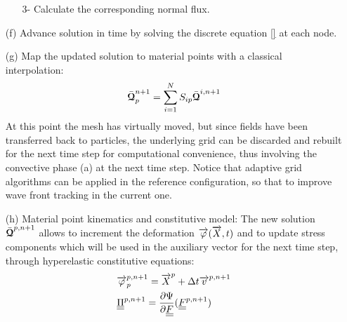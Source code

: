 \begin{itemize}
\begin{itemize}
  \item[3-] Calculate the corresponding normal flux.
  \end{itemize} 
\item[(f)] Advance solution in time by solving the discrete equation \eqref{} at each node.
\item[(g)] Map the updated solution to material points with a classical interpolation:
  \begin{equation}
    \bar{{\boldsymbol{\mathcal{Q}}}}^{n+1}_p = \sum_{i=1}^{N} S_{ip}\bar{{\boldsymbol{\mathcal{Q}}}}^{i,n+1}
  \end{equation}
  At this point the mesh has virtually moved, but since fields have been transferred back to particles, the underlying grid can be discarded and rebuilt for the next time step for computational convenience, thus involving the convective phase (a) at the next time step. Notice that adaptive grid algorithms can be applied in the reference configuration, so that to improve wave front tracking in the current one.
\item[(h)] Material point kinematics and constitutive model: The new solution $\bar{{\boldsymbol{\mathcal{Q}}}}^{p,n+1}$ allows to increment the deformation ${\overrightarrow{\varphi}}({\overrightarrow{X}},t)$ and to update stress components which will be used in the auxiliary vector for the next time step, through hyperelastic constitutive equations:
  \begin{align}
    & {\overrightarrow{\varphi}}^{p,n+1}_p = {\overrightarrow{X}}^p + \Delta t {\overrightarrow{v}}^{p,n+1} \\
    & {\underline{\underline{\Pi}}}^{p,n+1} =  \frac{\partial \Psi}{\partial {\underline{\underline{F}}}}({\underline{\underline{F}}}^{p,n+1})
  \end{align}
\end{itemize}

